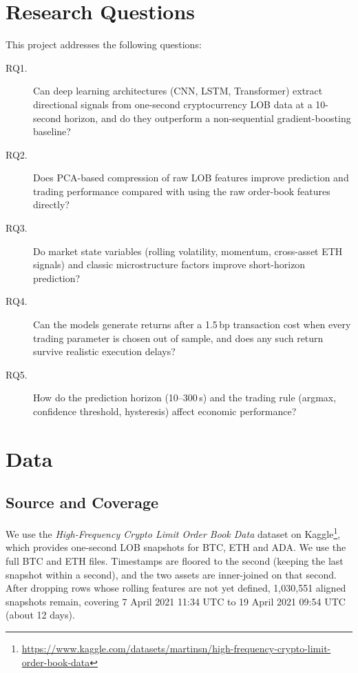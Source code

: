 \section{Research Questions}
\label{sec:rq}
This project addresses the following questions:
\begin{description}
  \item[RQ1.] Can deep learning architectures (CNN, LSTM, Transformer) extract
  directional signals from one-second cryptocurrency LOB data at a 10-second horizon,
  and do they outperform a non-sequential gradient-boosting baseline?
  \item[RQ2.] Does PCA-based compression of raw LOB features improve prediction and
  trading performance compared with using the raw order-book features directly?
  \item[RQ3.] Do market state variables (rolling volatility, momentum, cross-asset ETH
  signals) and classic microstructure factors improve short-horizon prediction?
  \item[RQ4.] Can the models generate returns after a 1.5\,bp transaction cost when every
  trading parameter is chosen out of sample, and does any such return survive realistic
  execution delays?
  \item[RQ5.] How do the prediction horizon (10--300\,s) and the trading rule (argmax,
  confidence threshold, hysteresis) affect economic performance?
\end{description}


\section{Data}
\label{sec:data}

\subsection{Source and Coverage}
We use the \emph{High-Frequency Crypto Limit Order Book Data} dataset on
Kaggle\footnote{\url{https://www.kaggle.com/datasets/martinsn/high-frequency-crypto-limit-order-book-data}}, which provides
one-second LOB snapshots for BTC, ETH and ADA. We use the full BTC and ETH files.
Timestamps are floored to the second (keeping the last snapshot within a second), and
the two assets are inner-joined on that second. After dropping rows whose rolling
features are not yet defined, 1,030,551 aligned snapshots remain, covering
7 April 2021 11:34 UTC to 19 April 2021 09:54 UTC (about 12 days).

